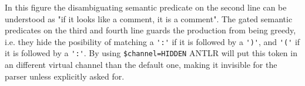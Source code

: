 In this figure the disambiguating semantic predicate on the second line can be understood as "if it looks like a comment, it is a comment". The gated semantic predicates on the third and fourth line guards the production from being greedy, i.e. they hide the posibility of matching a \verb!':'! if it is followed by a \verb!')'!, and \verb!'('! if it is followed by a \verb!':'!. By using \verb!$channel=HIDDEN! ANTLR will put this token in an different virtual channel than the default one, making it invisible for the parser unless explicitly asked for. 

